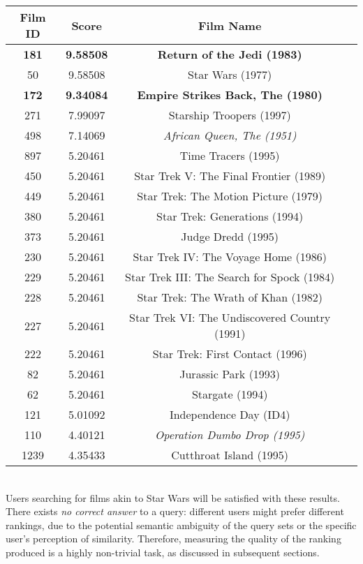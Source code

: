\documentclass[12pt,twoside,notitlepage,amsart]{report} %
\begin{document}
	\begin{center}
	
	\begin{tabular}{ | c | c | c | p{8cm}}
	
	\hline
	Film ID & Score & Film Name \\
	  \hline                        
	\textbf{181} &	\textbf{9.58508}	& \textbf{Return of the Jedi (1983)} \\
	50	& 9.58508	& Star Wars (1977) \\
	\textbf{172}	& \textbf{9.34084}	& \textbf{Empire Strikes Back, The (1980)}\\
	271	& 7.99097	& Starship Troopers (1997)\\
	498	& 7.14069	& \emph{African Queen, The (1951)}\\
	897	& 5.20461	& Time Tracers (1995)\\
	450	& 5.20461	& Star Trek V: The Final Frontier (1989)\\
	449	& 5.20461	& Star Trek: The Motion Picture (1979)\\
	380	& 5.20461	& Star Trek: Generations (1994)\\
	373	& 5.20461	& Judge Dredd (1995)\\
	230	& 5.20461	& Star Trek IV: The Voyage Home (1986)\\
	229	& 5.20461	& Star Trek III: The Search for Spock (1984)\\
	228	& 5.20461	& Star Trek: The Wrath of Khan (1982)\\
	227	& 5.20461	& Star Trek VI: The Undiscovered Country (1991)\\
	222	& 5.20461	& Star Trek: First Contact (1996)\\
	82	& 5.20461	& Jurassic Park (1993)\\
	62	& 5.20461	& Stargate (1994)\\
	121	& 5.01092	& Independence Day (ID4)\\
	110	& 4.40121	& \emph{Operation Dumbo Drop (1995)}\\
	1239 &	4.35433	& Cutthroat Island (1995)\\
	
	\hline  
	\end{tabular}
	\end{center}
	
	\\ 
	
	Users searching for films akin to Star Wars will be satisfied with these results. There exists \emph{no correct answer} to a query: different users might prefer different rankings, due to the potential semantic ambiguity of the query sets or the specific user's perception of similarity. Therefore, measuring the quality of the ranking produced is a highly non-trivial task, as discussed in subsequent sections. 
	
\end{document}
